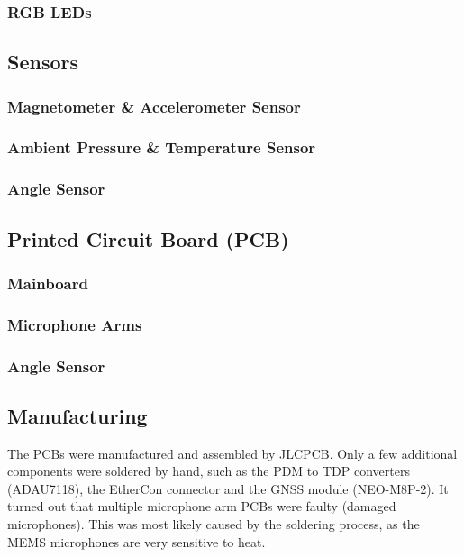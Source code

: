 \subsubsection{RGB LEDs}

\subsection{Sensors}

\subsubsection{Magnetometer \& Accelerometer Sensor}

\subsubsection{Ambient Pressure \& Temperature Sensor}

\subsubsection{Angle Sensor}

\subsection{Printed Circuit Board (PCB)}

\subsubsection{Mainboard}

\subsubsection{Microphone Arms}

\subsubsection{Angle Sensor}

\subsection{Manufacturing}
The PCBs were manufactured and assembled by JLCPCB.
Only a few additional components were soldered by hand, such as the PDM to TDP converters (ADAU7118), the EtherCon connector and the GNSS module (NEO-M8P-2).
It turned out that multiple microphone arm PCBs were faulty (damaged microphones).
This was most likely caused by the soldering process, as the MEMS microphones are very sensitive to heat.

